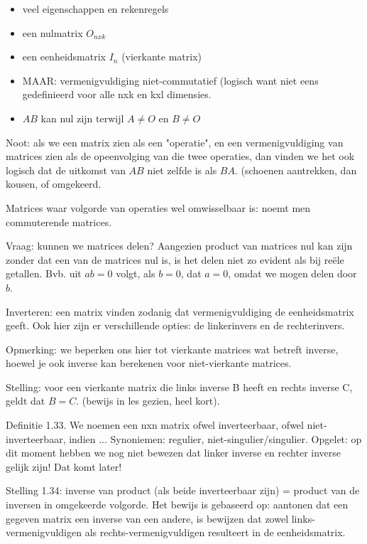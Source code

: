 \documentclass{article}
\begin{document}
\begin{itemize}
    \item veel eigenschappen en rekenregels
    \item een nulmatrix $O_{nxk}$
    \item een eenheidsmatrix $I_n$ (vierkante matrix) 
    \item MAAR: vermenigvuldiging niet-commutatief (logisch want niet eens gedefinieerd voor alle nxk en kxl dimensies. 
    \item $AB$ kan nul zijn terwijl $A \neq O$ en $B \neq O$
\end{itemize}


Noot: als we een matrix zien als een "operatie", en een vermenigvuldiging van matrices zien als de opeenvolging van die twee operaties, dan vinden we het ook logisch dat de uitkomst van $AB$ niet zelfde is als $BA$. (schoenen aantrekken, dan kousen, of omgekeerd. 

Matrices waar volgorde van operaties wel omwisselbaar is: noemt men commuterende matrices. 

Vraag: kunnen we matrices delen? Aangezien product van matrices nul kan zijn zonder dat een van de matrices nul is, is het delen niet zo evident als bij re{\"e}le getallen. Bvb. uit $ab=0$ volgt, als $b=0$, dat $a=0$, omdat we mogen delen door $b$. 

Inverteren: een matrix vinden zodanig dat vermenigvuldiging de eenheidsmatrix geeft. Ook hier zijn er verschillende opties: de linkerinvers en de rechterinvers. 

Opmerking: we beperken ons hier tot vierkante matrices wat betreft inverse, hoewel je ook inverse kan berekenen voor niet-vierkante matrices. 

Stelling: voor een vierkante matrix die links inverse B heeft en rechts inverse C, geldt dat $B=C$. (bewijs in les gezien, heel kort). 

Definitie 1.33. We noemen een nxn matrix ofwel inverteerbaar, ofwel niet-inverteerbaar, indien ... Synoniemen: regulier, niet-singulier/singulier. Opgelet: op dit moment hebben we nog niet bewezen dat linker inverse en rechter inverse gelijk zijn! Dat komt later! 

Stelling 1.34: inverse van product (als beide inverteerbaar zijn) =  product van de inversen in omgekeerde volgorde. Het bewijs is gebaseerd op: aantonen dat een gegeven matrix een inverse van een andere, is bewijzen dat zowel links-vermenigvuldigen als rechts-vermenigvuldigen resulteert in de eenheidsmatrix. 
\end{document}
